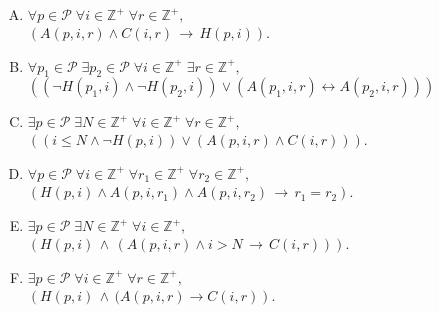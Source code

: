 \documentclass[jou]{apa6}
\begin{document}
\begin{enumerate}[(A)]
\item ${\displaystyle \forall p \in \mathcal{P}\; \forall i \in \mathbb{Z}^+\; \forall r \in \mathbb{Z}^+,}$\\
${\displaystyle \left( A(p,i,r) \wedge C(i,r) \,\rightarrow\, H(p,i) \right) }$.
\item ${\displaystyle \forall p_1 \in \mathcal{P}\; \exists p_2 \in \mathcal{P}\;
\forall i \in \mathbb{Z}^{+}\; \exists r \in \mathbb{Z}^{+},}$\\
${\displaystyle \left( (\neg H(p_1,i) \wedge \neg H(p_2,i)) \vee 
(A(p_1,i,r) \leftrightarrow A(p_2,i,r)) \right)}$
\item ${\displaystyle \exists p \in \mathcal{P}\; \exists N \in \mathbb{Z}^{+}\; 
\forall i \in \mathbb{Z}^{+}\; \forall r \in \mathbb{Z}^{+},}$\\
${\displaystyle \left( ( i \leq N \wedge \neg H(p,i) ) \vee (A(p,i,r) \wedge C(i,r)) \right)}$.
\item ${\displaystyle \forall p \in \mathcal{P}\; \forall i \in \mathbb{Z}^{+}\; \forall r_1 \in \mathbb{Z}^{+}\;
\forall r_2 \in \mathbb{Z}^{+},}$\\ 
${\displaystyle \left( H(p,i) \wedge A(p,i,r_1) \wedge  A(p,i,r_2) \,\rightarrow\, r_1 = r_2 \right)}$.
\item ${\displaystyle \exists p \in \mathcal{P}\; \exists N \in \mathbb{Z}^{+}\; \forall i \in \mathbb{Z}^{+},}$\\
${\displaystyle \left( H(p,i) \,\wedge\, ( A(p,i,r) \wedge i > N \,\rightarrow\, C(i,r) ) \right)}$.
\item ${\displaystyle \exists p \in \mathcal{P}\; \forall i \in \mathbb{Z}^{+}\; \forall r \in \mathbb{Z}^{+},}$\\
${\displaystyle \left( H(p,i) \,\wedge\, (A(p,i,r) \rightarrow C(i,r) \right)}$. 
\end{enumerate}
\end{document}
